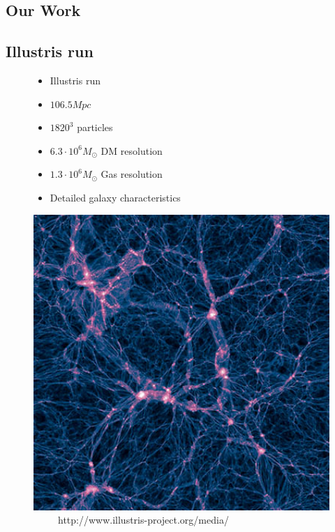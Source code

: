 \documentclass[xcolor=dvipsnames]{beamer}
\begin{document}
\begin{frame}
\section{Our Work}
\subsection{Illustris run}

\begin{figure}[ht]
        \begin{minipage}[b]{0.5\linewidth}
            \begin{itemize}
			\item Illustris run
			\item $106.5Mpc$
			\item $1820^3$ particles
			\item $6.3\cdot 10^{6}M_{\odot}$ DM resolution
			\item $1.3\cdot 10^{6}M_{\odot}$ Gas resolution
			\item Detailed galaxy characteristics
			\end{itemize}

        \end{minipage}
        \hspace{0.0cm}
        \begin{minipage}[b]{0.40\linewidth}
            \includegraphics[width=1\textwidth]{illustris}
			\centering
			{\tiny \ \ \ \ \ http://www.illustris-project.org/media/}
        \end{minipage}
    \end{figure}

\end{frame}
\end{document}
